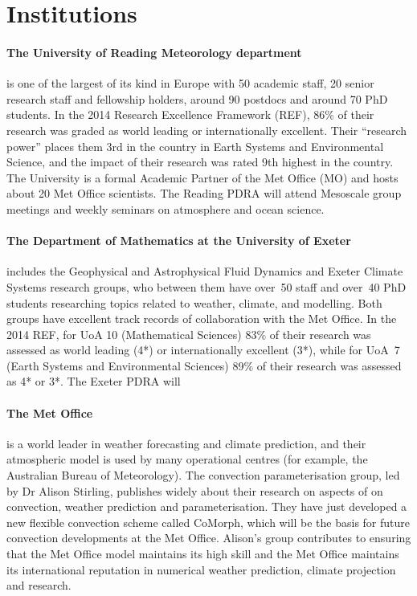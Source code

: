 \documentclass[11pt,a4paper]{article}
\begin{document}
\section*{Institutions}

\paragraph*{The University of Reading Meteorology department} is one of the largest of its kind in Europe with 50 academic staff, 20 senior research staff and fellowship holders, around 90 postdocs and around 70 PhD students. In the 2014 Research Excellence Framework (REF), 86\% of their research was graded as world leading or internationally excellent. Their ``research power'' places them 3rd in the country in Earth Systems and Environmental Science, and the impact of their research was rated 9th highest in the country. The University is a formal Academic Partner of the Met Office (MO) and hosts about 20 Met Office scientists. The Reading PDRA will attend Mesoscale group meetings and weekly seminars on atmosphere and ocean science.

\paragraph*{The Department of Mathematics at the University of Exeter} includes the Geophysical and Astrophysical Fluid Dynamics and Exeter Climate Systems research groups, who between them have over~50 staff and over~40 PhD students researching topics related to weather, climate, and modelling. Both groups have excellent track records of collaboration with the Met Office. In the 2014 REF, for UoA 10 (Mathematical Sciences) 83\% of their research was assessed as world leading (4*) or internationally excellent (3*), while for UoA~7 (Earth Systems and Environmental Sciences) 89\% of their research was assessed as 4* or 3*. The Exeter PDRA will 

\paragraph*{The Met Office} is a world leader in weather forecasting and climate prediction, and their atmospheric model is used by many operational centres (for example, the Australian Bureau of Meteorology). The convection parameterisation group, led by Dr Alison Stirling, publishes widely about their research on aspects of on convection, weather prediction and parameterisation. They have just developed a new flexible convection scheme called CoMorph, which will be the basis for future convection developments at the Met Office. Alison's group contributes to ensuring that the Met Office model maintains its high skill and the Met Office maintains its international reputation in numerical weather prediction, climate projection and research. 
\end{document}
